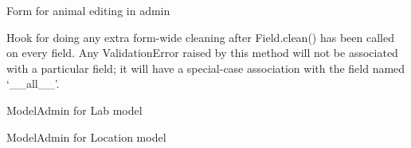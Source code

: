 \documentclass[letterpaper,10pt,openany,oneside,english]{sphinxmanual}
\begin{document}
\begin{fulllineitems}
\label{\detokenize{index:animals.admin.AnimalForm}}
Form for animal editing in admin

\begin{fulllineitems}
\label{\detokenize{index:animals.admin.AnimalForm.clean}}
Hook for doing any extra form-wide cleaning after Field.clean() has been
called on every field. Any ValidationError raised by this method will
not be associated with a particular field; it will have a special-case
association with the field named ‘\_\_all\_\_’.

\end{fulllineitems}


\end{fulllineitems}


\begin{fulllineitems}
\label{\detokenize{index:animals.admin.LabAdmin}}
ModelAdmin for Lab model

\end{fulllineitems}


\begin{fulllineitems}
\label{\detokenize{index:animals.admin.LocationAdmin}}
ModelAdmin for Location model

\end{fulllineitems}

\end{document}
